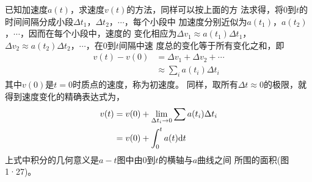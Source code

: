     已知加速度$a(t)$，求速度$v(t)$的方法，同样可以按上面的方
法求得，将0到$t$的时间间隔分成小段$\Delta t_1$，$\Delta t_2$，$\cdots$，每个小段中
加速度分别近似为$a(t_1)$，$a(t_2)$，$\cdots$，因而在每个小段中，速度的
变化相应为$\Delta v_1\approx a(t_1)\Delta t_1$，$\Delta v_2\approx a(t_2)\Delta t_2$，$\cdots$，在0到$t$间隔中速
度总的变化等于所有变化之和，即
\begin{equation}\label{eqn:01.11.05}
    \begin{aligned}
        v(t)-v(0) &=\Delta v_{1}+\Delta v_{2}+\cdots \\
        & \approx \sum_{i} a\left(t_{i}\right) \Delta t_{i}
    \end{aligned}
\end{equation}
其中$v(0)$是$t=0$时质点的速度，称为初速度。
同样，取所有$\Delta t\approx 0$的极限，就得到速度变化的精确表达式为，
\begin{equation}\label{eqn:01.11.06}
    \begin{aligned}
        v(t) &=v(0)+\lim _{\Delta t_{i} \rightarrow 0} \sum a(t_{i}) \Delta t_{i} \\
        &=v(0)+\int_{0}^{t} a(t) {\rm d}  t
    \end{aligned}
\end{equation}
上式中积分的几何意义是$a-t$图中由0到$t$的横轴与$a$曲线之间
所围的面积(图1·27)。

